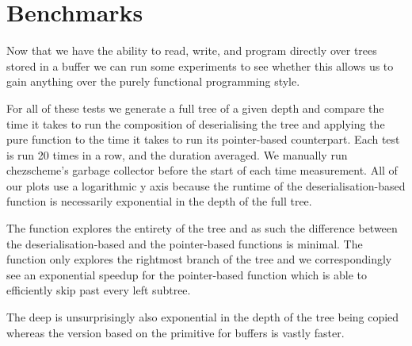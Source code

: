 


\section{Benchmarks}\label{sec:timing}

Now that we have the ability to read, write, and program directly
over trees stored in a buffer we can run some experiments to see
whether this allows us to gain anything over the purely functional
programming style.

For all of these tests we generate a full tree of a given depth and
compare the time it takes to run the composition of deserialising
the tree and applying the pure function to the time it takes to run
its pointer-based counterpart.
%
Each test is run 20 times in a row, and the duration averaged.
%
We manually run chezscheme's garbage collector before the start of
each time measurement.
%
All of our plots use a logarithmic y axis because the runtime of the
deserialisation-based function is necessarily exponential in the depth
of the full tree.

The  function explores the entirety of the tree
and as such the difference between the deserialisation-based and the
pointer-based functions is minimal.
%
The  function only explores the rightmost
branch of the tree and we correspondingly see an exponential speedup
for the pointer-based function which is able to efficiently skip past
every left subtree.

\begin{center}
\begin{minipage}{.45\textwidth}
\end{minipage}\qquad
\begin{minipage}{.45\textwidth}
\end{minipage}
\end{center}

The deep  is unsurprisingly also exponential in
the depth of the tree being copied whereas the version based on the
 primitive for buffers is vastly faster.

\begin{center}
\begin{minipage}{.45\textwidth}
\end{minipage}
\end{center}
